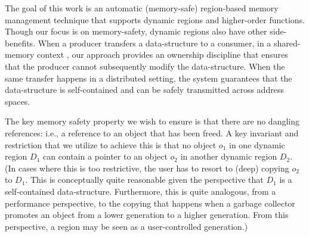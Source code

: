 The goal of this work is an automatic (memory-safe) region-based memory management technique
that supports dynamic regions and higher-order functions.
Though our focus is on memory-safety, dynamic regions also have other side-benefits.
When a producer transfers a data-structure to a consumer, in a shared-memory context , our approach
provides an ownership discipline that ensures that the producer cannot subsequently modify
the data-structure. When the same transfer happens in a distributed setting, the system guarantees
that the data-structure is self-contained and can be safely transmitted across address spaces.

The key memory safety property we wish to ensure is that there are no dangling references:
i.e., a reference to an object that has been freed.
A key invariant and restriction that we utilize to achieve this is that no object $o_1$ in one dynamic
region $D_1$ can contain a pointer to an object $o_2$ in another dynamic region $D_2$.
(In cases where this is too restrictive, the user has to resort to (deep) copying $o_2$ to $D_1$.
This is conceptually quite reasonable given the perspective that $D_1$ is a self-contained data-structure.
Furthermore, this is quite analogous, from a performance perspective, to the copying that happens
when a garbage collector promotes an object from a lower generation to a higher generation.
From this perspective, a region may be seen as a user-controlled generation.)

